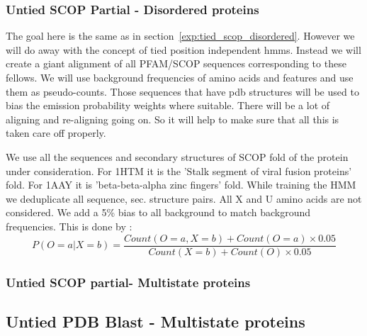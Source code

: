 \documentclass{article}
\begin{document}
\subsubsection{Untied SCOP Partial - Disordered proteins}
\label{exp:untied_scop_disordered}
The goal here is the same as in section~\ref{exp:tied_scop_disordered}. However we will do away with the concept of tied position independent hmms. Instead we will create a giant alignment of all PFAM/SCOP sequences corresponding to these fellows. We will use background frequencies of amino acids and features and use them as pseudo-counts. Those sequences that have pdb structures will be used to bias the emission probability weights where suitable. There will be a lot of aligning and re-aligning going on. So it will help to make sure that all this is taken care off properly.

We use all the sequences and secondary structures of SCOP fold of the protein under consideration. For 1HTM it is the 'Stalk segment of viral fusion proteins' fold. For 1AAY it is 'beta-beta-alpha zinc fingers' fold. 
While training the HMM we deduplicate all sequence, sec. structure pairs. All X and U amino acids are not considered. We add a 5\% bias to all background to match background frequencies. This is done by : 
\[
P(O=a|X=b) = \frac{Count(O=a,X=b)+Count(O=a)\times 0.05}{Count(X=b)+Count(O)\times 0.05}
\]


\subsubsection{Untied SCOP partial- Multistate proteins}


\subsection{Untied PDB Blast - Multistate proteins}



\end{document}
